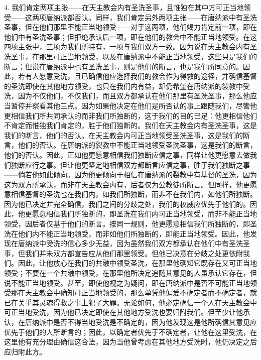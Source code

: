 4. 我们肯定两项主张——在天主教会内有圣洗圣事，且惟独在其中方可正当地领受——这两项唐纳派都否认。同样，我们肯定另外两项主张——在唐纳派中有圣洗圣事，但在他们那里不能正当地领受——对于这两项，他们竭力肯定前一项，即在他们中有圣洗圣事；但拒绝承认后一项，即在他们的教会中不能正当地领受。在这四项主张中，三项为我们所特有，一项与我们双方一致。因为说在天主教会内有圣洗圣事，在那里可正当地领受，以及在唐纳派中不能正当地领受，这些只是我们的断言；但说在唐纳派中也有圣洗圣事，则是他们的断言，也是我们所同意的。因此，若有人愿意受洗，且已确信他应选择我们的教会作为得救的途径，并确信基督的圣洗即使在其他地方领受，也只在我们内有益，却仍希望在唐纳派的裂教中受洗，因为不仅他们，不仅我们，而且双方都承认在他们那里有圣洗圣事，那么他应当暂停并察看其他三点。因为如果他决定在他们是所否认的事上跟随我们，尽管他更相信我们所共同承认的而非我们所独断的，这于我们的目的已足：他更相信他们不肯定而惟独我们肯定的，胜于他们独断的。我们在天主教会内有圣洗圣事，这是我们的断言，他们的否认。在天主教会内可正当地领受圣洗圣事，这是我们的断言，他们的否认。在唐纳派的裂教中不能正当地领受圣洗圣事，这是我们的断言，他们的否认。因此，正如他更愿意相信我们独断应信之事，同样让他更愿意去做我们独断应行之事。但让他更坚定地相信双方都断言应信之事，胜于我们独断之事——倘若他如此倾向。因为他更倾向于相信在唐纳派的裂教中有基督的圣洗，因为这为双方所承认，而非在天主教会内有，后者仅为公教徒所断言。但同样，他更愿意相信基督的圣洗也在我们内，如我们所独断，而非不在我们内，如他们所独断。因为他已决定并完全确信，我们之间的分歧之处，我们的权威应优先于他们的。因此，他更愿意相信我们所独断的，即圣洗在我们内可正当地领受，而非不能正当地领受，因后者仅基于他们的断言。按同一规则，他更愿意相信我们所独断的，即圣洗在他们内不能正当地领受，而非如他们所独断的，即能正当地领受。因此，他发现在唐纳派中受洗的信心多少无益，因为虽然我们双方都承认在他们中有圣洗圣事，但我们并未双方都宣告应从他们那里领受。但他已决意在分歧之处更依附我们。因此，让他放心在我们的共融中领受圣洗，在那里他确知它既存在又可正当地领受；不要在一个共融中领受，在那里他所决定追随其意见的人虽承认它存在，但说不能正当地领受。甚至，即使他视之为疑问，即在唐纳派中是否不可能正当地领受那在天主教会中确知可正当地领受的，那么单凭他偏爱不确定者而不确定者，就已在关乎其灵魂得救之事上犯了大罪。无论如何，他必定确信一个人在天主教会中可正当地受洗，因为他已决定即使在其他地方受洗也要归附我们。但至少让他承认，在唐纳派中是否不得当地受洗是不确定的，因为他发现这是他所确信其意见应优先于他们的人所断言的；因此，以确定者优先于不确定者，让他在这里受洗，在这里他有充分理由确信这合法，因为当他曾考虑在其他地方受洗时，他仍决定之后应归附此方。\par


